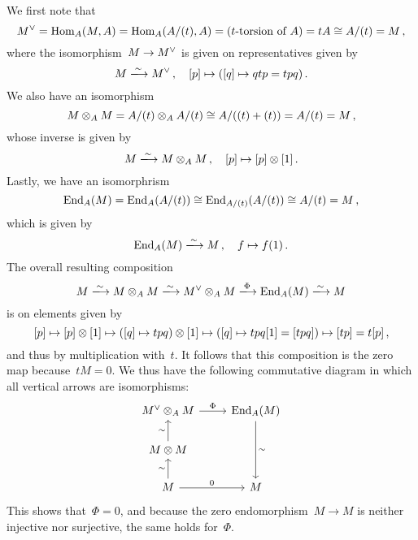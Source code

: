 We first note that
\[
        \dual{M}
  =     \Hom_A(M, A)
  =     \Hom_A( A/(t), A)
  =     (\text{\dash{$t$}{torsion} of~$A$})
  =     tA
  \cong A/(t)
  =     M \,,
\]
where the isomorphism~$M \to M^\vee$ is given on representatives given by
\[
                  M
  \xlongto{\sim}  \dual{M} \,,
  \quad           [p]
  \mapsto         ( [q] \mapsto qtp = tpq ) \,.
\]
We also have an isomorphism
\[
        M \otimes_A M
  =     A/(t) \otimes_A A/(t)
  \cong A/( (t) + (t) )
  =     A/(t)
  =     M \,,
\]
whose inverse is given by
\[
                  M
  \xlongto{\sim}  M \tensor_A M \,,
  \quad           [p]
  \mapsto         [p] \tensor [1] \,.
\]
Lastly, we have an isomorphrism
\[
        \operatorname{End}_A(M)
  =     \operatorname{End}_A(A/(t))
  \cong \operatorname{End}_{A/(t)}(A/(t))
  \cong A/(t)
  =     M \,,
\]
which is given by
\[
                  \End_A(M)
  \xlongto{\sim}  M \,,
  \quad           f
  \mapsto         f(1) \,.
\]
The overall resulting composition
\[
                  M
  \xlongto{\sim}  M \tensor_A M
  \xlongto{\sim}  \dual{M} \tensor_A M
  \xlongto{\Phi}  \End_A(M)
  \xlongto{\sim}  M
\]
is on elements given by
\[
          [p]
  \mapsto [p] \otimes [1]
  \mapsto ( [q] \mapsto tpq ) \otimes [1]
  \mapsto ( [q] \mapsto tpq [1] = [tpq] )
  \mapsto [tp]
  =       t [p] \,,
\]
and thus by multiplication with~$t$.
It follows that this composition is the zero map because~$t M = 0$.
We thus have the following commutative diagram in which all vertical arrows are isomorphisms:
\[
  \begin{tikzcd}
      \dual{M} \tensor_A M
      \arrow{r}[above]{\Phi}
    & \End_A(M)
      \arrow{dd}[right]{\sim}
    \\
      M \tensor M
      \arrow{u}[left]{\sim}
    & {}
    \\
      M
      \arrow{u}[left]{\sim}
      \arrow{r}[above]{0}
    & M
  \end{tikzcd}
\]
This shows that~$\Phi = 0$, and because the zero endomorphism~$M \to M$ is neither injective nor surjective, the same holds for~$\Phi$.

















\subsection{}



